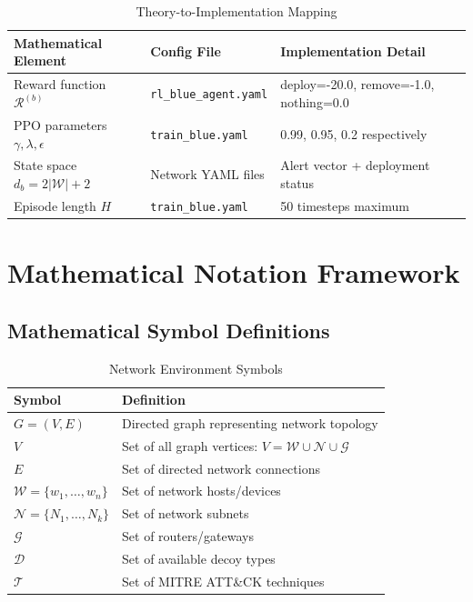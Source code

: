 \documentclass[12pt,oneside]{article}
\begin{document}
\begin{table}[H]
\centering
\caption{Theory-to-Implementation Mapping}
\label{tab:theory_implementation}
\small
\begin{tabular}{|p{3cm}|p{4cm}|p{5cm}|}
\hline
\rowcolor{cwBorder!30} \textbf{Mathematical Element} & \textbf{Config File} & \textbf{Implementation Detail} \\
\hline
Reward function $\mathcal{R}^{(b)}$ & \texttt{rl\_blue\_agent.yaml} & deploy=-20.0, remove=-1.0, nothing=0.0 \\
\hline
PPO parameters $\gamma, \lambda, \epsilon$ & \texttt{train\_blue.yaml} & 0.99, 0.95, 0.2 respectively \\
\hline
State space $d_b = 2|\mathcal{W}| + 2$ & Network YAML files & Alert vector + deployment status \\
\hline
Episode length $H$ & \texttt{train\_blue.yaml} & 50 timesteps maximum \\
\hline
\end{tabular}
\end{table}

\section{Mathematical Notation Framework}

\subsection{Mathematical Symbol Definitions}

\begin{table}[H]
\centering
\caption{Network Environment Symbols}
\label{tab:network_symbols}
\small
\begin{tabular}{|l|p{7cm}|}
\hline
\rowcolor{cwBorder!30} \textbf{Symbol} & \textbf{Definition} \\
\hline
$G = (V, E)$ & Directed graph representing network topology \\
$V$ & Set of all graph vertices: $V = \mathcal{W} \cup \mathcal{N} \cup \mathcal{G}$ \\
$E$ & Set of directed network connections \\
$\mathcal{W} = \{w_1, \ldots, w_n\}$ & Set of network hosts/devices \\
$\mathcal{N} = \{N_1, \ldots, N_k\}$ & Set of network subnets \\
$\mathcal{G}$ & Set of routers/gateways \\
$\mathcal{D}$ & Set of available decoy types \\
$\mathcal{T}$ & Set of MITRE ATT\&CK techniques \\
\hline
\end{tabular}
\end{table}
\end{document}
